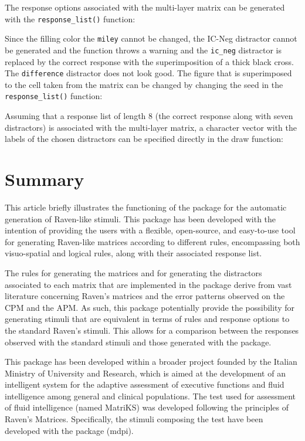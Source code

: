 The response options associated with the multi-layer matrix can be generated with the \texttt{response\_list()} function:



Since the filling color the \texttt{miley} cannot be changed, the IC-Neg distractor cannot be generated and the function throws a warning and the \texttt{ic\_neg} distractor is replaced by the correct response with the superimposition of a thick black cross.
The \texttt{difference} distractor does not look good.
The figure that is superimposed to the cell taken from the matrix can be changed by changing the seed in the \texttt{response\_list()} function:



Assuming that a response list of length 8 (the correct response along with seven distractors) is associated with the multi-layer matrix, a character vector with the labels of the chosen distractors can be specified directly in the draw function:



\section{Summary}\label{summary}

This article briefly illustrates the functioning of the  package for the automatic generation of Raven-like stimuli.
This package has been developed with the intention of providing the users with a flexible, open-source, and easy-to-use tool for generating Raven-like matrices according to different rules, encompassing both visuo-spatial and logical rules, along with their associated response list.

The rules for generating the matrices and for generating the distractors associated to each matrix that are implemented in the  package derive from vast literature concerning Raven's matrices and the error patterns observed on the CPM and the APM.
As such, this package potentially provide the possibility for generating stimuli that are equivalent in terms of rules and response options to the standard Raven's stimuli.
This allows for a comparison between the responses observed with the standard stimuli and those generated with the package.

This package has been developed within a broader project founded by the Italian Ministry of University and Research, which is aimed at the development of an intelligent system for the adaptive assessment of executive functions and fluid intelligence among general and clinical populations.
The test used for assessment of fluid intelligence (named MatriKS) was developed following the principles of Raven's Matrices.
Specifically, the stimuli composing the test have been developed with the  package (mdpi).

